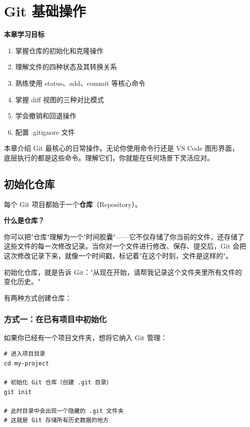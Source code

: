 \documentclass[12pt,a4paper,openany]{ctexbook}
\begin{document}
\chapter{Git 基础操作}

\begin{infobox}
\textbf{本章学习目标}
\begin{enumerate}[leftmargin=1.5em]
  \item 掌握仓库的初始化和克隆操作
  \item 理解文件的四种状态及其转换关系
  \item 熟练使用 status、add、commit 等核心命令
  \item 掌握 diff 视图的三种对比模式
  \item 学会撤销和回退操作
  \item 配置 .gitignore 文件
\end{enumerate}
\end{infobox}

本章介绍 Git 最核心的日常操作。无论你使用命令行还是 VS Code 图形界面，
底层执行的都是这些命令。理解它们，你就能在任何场景下灵活应对。

\section{初始化仓库}

每个 Git 项目都始于一个\textbf{仓库}（Repository）。

\begin{infobox}
\textbf{什么是仓库？}

你可以把"仓库"理解为一个"时间胶囊"——它不仅存储了你当前的文件，还存储了这些文件的每一次修改记录。当你对一个文件进行修改、保存、提交后，Git 会把这次修改记录下来，就像一个时间戳，标记着"在这个时刻，文件是这样的"。

初始化仓库，就是告诉 Git："从现在开始，请帮我记录这个文件夹里所有文件的变化历史。"
\end{infobox}

有两种方式创建仓库：

\subsection{方式一：在已有项目中初始化}

如果你已经有一个项目文件夹，想将它纳入 Git 管理：

\begin{lstlisting}[style=shell]
# 进入项目目录
cd my-project

# 初始化 Git 仓库（创建 .git 目录）
git init

# 此时目录中会出现一个隐藏的 .git 文件夹
# 这就是 Git 存储所有历史数据的地方
\end{lstlisting}
\end{document}
